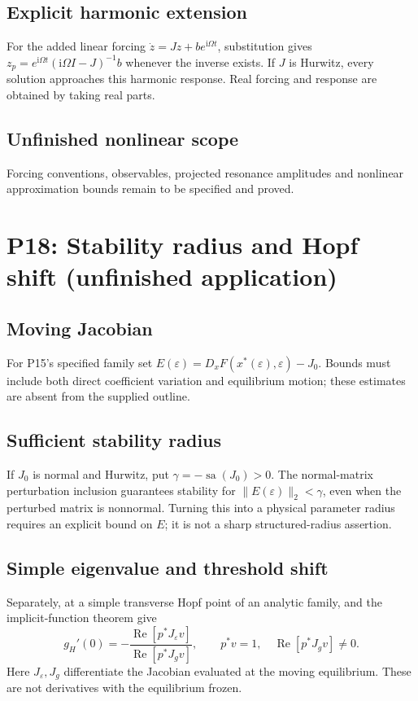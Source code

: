 \documentclass[11pt]{article}
\let\OriginalCite\cite
\renewcommand{\cite}[2][]{%
  \textcolor{CitationRed}{%
    \if\relax\detokenize{#1}\relax
      \OriginalCite{#2}%
    \else
      \OriginalCite[#1]{#2}%
    \fi}}
\newcommand{\ii}{\mathrm{i}}
\newcommand{\eps}{\varepsilon}
\DeclareMathOperator{\sa}{sa}
\DeclareMathOperator{\Ree}{Re}
\theoremstyle{definition}
\theoremstyle{remark}
\begin{document}
\subsection{Explicit harmonic extension}\label{slot:P17-3}
For the added linear forcing $\dot z=Jz+be^{\ii\Omega t}$, substitution
gives $z_p=e^{\ii\Omega t}(\ii\Omega I-J)^{-1}b$ whenever the inverse
exists. If $J$ is Hurwitz, every solution approaches this harmonic response.
Real forcing and response are obtained by taking real parts.
\subsection{Unfinished nonlinear scope}\label{slot:P17-4}
Forcing conventions, observables, projected resonance amplitudes and
nonlinear approximation bounds remain to be specified and proved.


\section{P18: Stability radius and Hopf shift (unfinished application)}
\label{sec:P18}
\subsection{Moving Jacobian}\label{slot:P18-1}
For P15's specified family set
$E(\eps)=D_xF(x^*(\eps),\eps)-J_0$. Bounds must include both direct
coefficient variation and equilibrium motion; these estimates are absent
from the supplied outline.
\subsection{Sufficient stability radius}\label{slot:P18-2}
If $J_0$ is normal and Hurwitz, put $\gamma=-\sa(J_0)>0$.
The normal-matrix perturbation inclusion
\cite[\S1 and Theorem~$4_\eps$]{EmbreeTrefethen2001} guarantees
stability for $\|E(\eps)\|_2<\gamma$, even when the perturbed matrix
is nonnormal. Turning this into a physical parameter radius requires
an explicit bound on $E$; it is not a sharp structured-radius assertion.
\subsection{Simple eigenvalue and threshold shift}\label{slot:P18-3}
Separately, at a simple transverse Hopf point of an analytic family,
\cite[Theorem~1]{GreenbaumLiOverton2020} and the implicit-function
theorem give
\[
 g_H'(0)=-\frac{\Ree[p^*J_\eps v]}{\Ree[p^*J_gv]},\qquad
 p^*v=1,\quad\Ree[p^*J_gv]\ne0.
\]
Here $J_\eps,J_g$ differentiate the Jacobian evaluated at the moving
equilibrium. These are not derivatives with the equilibrium frozen.
\end{document}
